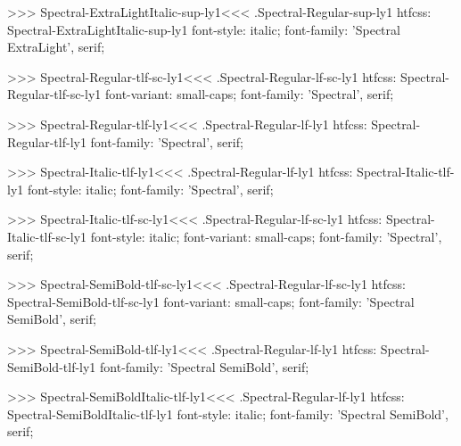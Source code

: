 >>>
\<Spectral-ExtraLightItalic-sup-ly1\><<<
.Spectral-Regular-sup-ly1
htfcss:  Spectral-ExtraLightItalic-sup-ly1  font-style: italic; font-family: 'Spectral ExtraLight', serif;

>>>
\<Spectral-Regular-tlf-sc-ly1\><<<
.Spectral-Regular-lf-sc-ly1
htfcss:  Spectral-Regular-tlf-sc-ly1  font-variant: small-caps; font-family: 'Spectral', serif;

>>>
\<Spectral-Regular-tlf-ly1\><<<
.Spectral-Regular-lf-ly1
htfcss:  Spectral-Regular-tlf-ly1  font-family: 'Spectral', serif;

>>>
\<Spectral-Italic-tlf-ly1\><<<
.Spectral-Regular-lf-ly1
htfcss:  Spectral-Italic-tlf-ly1  font-style: italic; font-family: 'Spectral', serif;

>>>
\<Spectral-Italic-tlf-sc-ly1\><<<
.Spectral-Regular-lf-sc-ly1
htfcss:  Spectral-Italic-tlf-sc-ly1  font-style: italic; font-variant: small-caps; font-family: 'Spectral', serif;

>>>
\<Spectral-SemiBold-tlf-sc-ly1\><<<
.Spectral-Regular-lf-sc-ly1
htfcss:  Spectral-SemiBold-tlf-sc-ly1  font-variant: small-caps; font-family: 'Spectral SemiBold', serif;

>>>
\<Spectral-SemiBold-tlf-ly1\><<<
.Spectral-Regular-lf-ly1
htfcss:  Spectral-SemiBold-tlf-ly1  font-family: 'Spectral SemiBold', serif;

>>>
\<Spectral-SemiBoldItalic-tlf-ly1\><<<
.Spectral-Regular-lf-ly1
htfcss:  Spectral-SemiBoldItalic-tlf-ly1  font-style: italic; font-family: 'Spectral SemiBold', serif;

